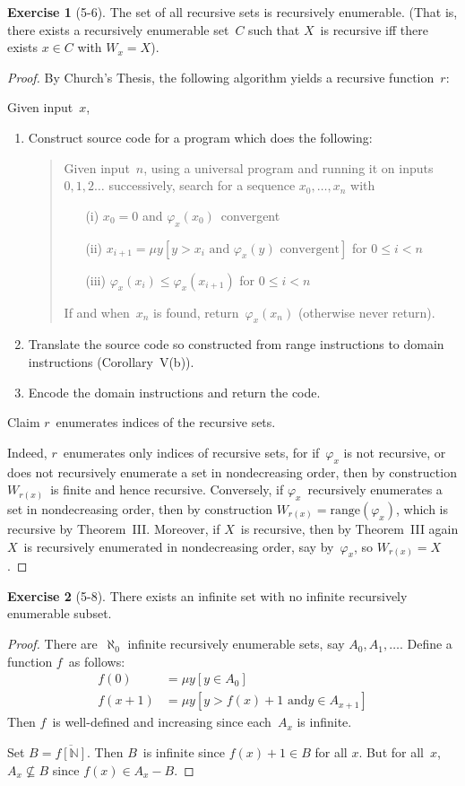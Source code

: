 \documentclass[letterpaper]{article}
\newcommand{\N}{\mathbb{N}}
\newcommand{\ran}{\mathrm{range}}
\newcommand{\comp}[1]{\overline{#1}}
\theoremstyle{definition}
\newtheorem*{exer}{Exercise}
\theoremstyle{remark}
\theoremstyle{direction}
\begin{document}
\begin{exer}[5-6]
The set of all recursive sets is recursively enumerable. (That is, there exists a recursively enumerable set~$C$ such that $X$~is recursive iff there exists $x\in C$ with $W_x=X$).
\end{exer}
\begin{proof}
By Church's Thesis, the following algorithm yields a recursive function~$r$:

Given input~$x$,
\begin{enumerate}[itemsep=0pt]
\item Construct source code for a program which does the following:
\begin{quote}
Given input~$n$, using a universal program and running it on inputs $0,1,2\ldots$ successively, search for a sequence $x_0,\ldots,x_n$ with
\begin{enumerate}[itemsep=0pt]
\item[(i)] $x_0=0$ and $\varphi_x(x_0)$~convergent
\item[(ii)] $x_{i+1}=\mu y[y>x_i\text{ and }\varphi_x(y)\text{ convergent}]$ for $0\le i<n$
\item[(iii)] $\varphi_x(x_i)\le\varphi_x(x_{i+1})$ for $0\le i<n$
\end{enumerate}
If and when~$x_n$ is found, return~$\varphi_x(x_n)$ (otherwise never return).
\end{quote}
\item Translate the source code so constructed from range instructions to domain instructions (Corollary~V(b)).
\item Encode the domain instructions and return the code.
\end{enumerate}
Claim $r$~enumerates indices of the recursive sets.

Indeed, $r$~enumerates only indices of recursive sets, for if~$\varphi_x$ is not recursive, or does not recursively enumerate a set in nondecreasing order, then by construction $W_{r(x)}$~is finite and hence recursive. Conversely, if $\varphi_x$~recursively enumerates a set in nondecreasing order, then by construction $W_{r(x)}=\ran(\varphi_x)$, which is recursive by Theorem~III. Moreover, if $X$~is recursive, then by Theorem~III again $X$~is recursively enumerated in nondecreasing order, say by~$\varphi_x$, so $W_{r(x)}=X$.
\end{proof}

\begin{exer}[5-8]
There exists an infinite set with no infinite recursively enumerable subset.
\end{exer}
\begin{proof}
There are~$\aleph_0$ infinite recursively enumerable sets, say $A_0,A_1,\ldots$. Define a function $f$~as follows:
\begin{align*}
f(0)&=\mu y[y\in A_0]\\
f(x+1)&=\mu y[y>f(x)+1\text{ and} y\in A_{x+1}]
\end{align*}
Then $f$~is well-defined and increasing since each~$A_x$ is infinite.

Set $B=\comp{f[\N]}$. Then $B$~is infinite since $f(x)+1\in B$ for all $x$. But for all~$x$, $A_x\not\subseteq B$ since $f(x)\in A_x-B$.
\end{proof}
\end{document}
